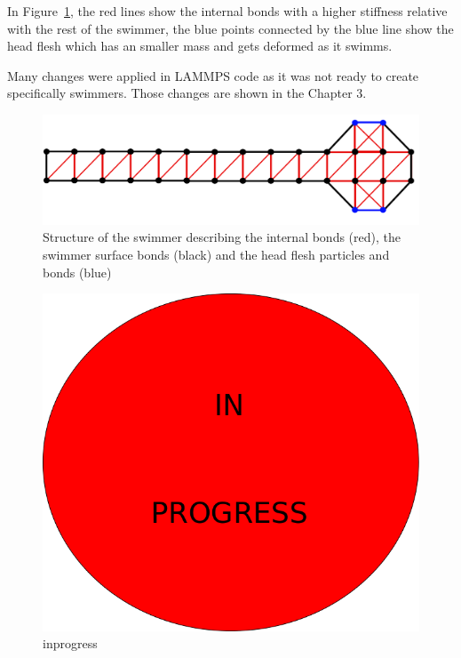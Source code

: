 In Figure~\ref{fig:Bild5}, the red lines show the internal bonds with a higher stiffness relative with the rest of the swimmer, the blue points connected by the blue line show the 
head flesh which has an smaller mass and gets deformed as it swimms.\par
Many changes were applied in LAMMPS code as it was not ready to create specifically swimmers. Those changes are shown in the Chapter 3.


\begin{figure}[ht]
\centering
  \begin{footnotesize}
  \includegraphics[scale=0.25]{images/swimmer-compare.png}
  \caption[Structure of the swimmer describing the internal bonds (red), the swimmer surface bonds (black) and the head flesh particles and bonds(blue)]{Structure of the swimmer describing the internal bonds (red), the swimmer surface bonds (black) and the head flesh particles and bonds (blue)}
  \label{fig:Bild5}
  \end{footnotesize}
\end{figure} 










\begin{figure}
\centering
  \begin{footnotesize}
  \includegraphics[scale=0.25]{images/in-progress.png}
  \caption[inprogress]{inprogress}
  \label{fig:Bild100}
  \end{footnotesize}
\end{figure} 


